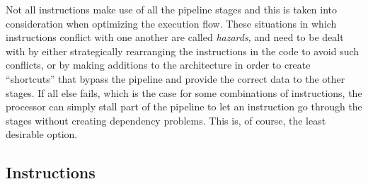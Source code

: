 Not all instructions make use of all the pipeline stages and this is taken into consideration when optimizing the execution flow.
These situations in which instructions conflict with one another are called \emph{hazards}, and need to be dealt with by either strategically rearranging the instructions in the code to avoid such conflicts, or by making additions to the architecture in order to create ``shortcuts'' that bypass the pipeline and provide the correct data to the other stages. If all else fails, which is the case for some combinations of instructions, the processor can simply stall part of the pipeline to let an instruction go through the stages without creating dependency problems. This is, of course, the least desirable option.

\subsection{Instructions}
